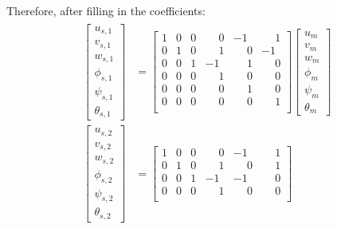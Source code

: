 \documentclass[10pt,b5paper,titlepage]{book}
\newenvironment{eqarray}
{
    \begin{eqnarray}
        \begin{aligned}
}
{
        \end{aligned}
    \end{eqnarray}
}
\begin{document}
Therefore, after filling in the coefficients:
\renewcommand\arraystretch{1.6}
\begin{eqarray}
    \begin{bmatrix}
        u_{s,1} \\
        v_{s,1} \\
        w_{s,1} \\
        \phi_{s,1} \\
        \psi_{s,1} \\
        \theta_{s,1}
    \end{bmatrix}
    &= \begin{bmatrix}
        1 & 0 & 0 & \phantom{-}0 & -1 & \phantom{-}1 \\
        0 & 1 & 0 & \phantom{-}1 & \phantom{-}0 & -1 \\
        0 & 0 & 1 & -1 & \phantom{-}1 & \phantom{-}0 \\
        0 & 0 & 0 & \phantom{-}1 & \phantom{-}0 & \phantom{-}0 \\
        0 & 0 & 0 & \phantom{-}0 & \phantom{-}1 & \phantom{-}0 \\
        0 & 0 & 0 & \phantom{-}0 & \phantom{-}0 & \phantom{-}1 \\
    \end{bmatrix}
    \begin{bmatrix}
        u_m \\
        v_m \\
        w_m \\
        \phi_m \\
        \psi_m \\
        \theta_m
    \end{bmatrix} \\
    \begin{bmatrix}
        u_{s,2} \\
        v_{s,2} \\
        w_{s,2} \\
        \phi_{s,2} \\
        \psi_{s,2} \\
        \theta_{s,2}
    \end{bmatrix}
    &= \begin{bmatrix}
        1 & 0 & 0 & \phantom{-}0 & -1 & \phantom{-}1 \\
        0 & 1 & 0 & \phantom{-}1 & \phantom{-}0 & \phantom{-}1 \\
        0 & 0 & 1 & -1 & -1 & \phantom{-}0 \\
        0 & 0 & 0 & \phantom{-}1 & \phantom{-}0 & \phantom{-}0 \\

\end{bmatrix}
\end{eqarray}
\end{document}
